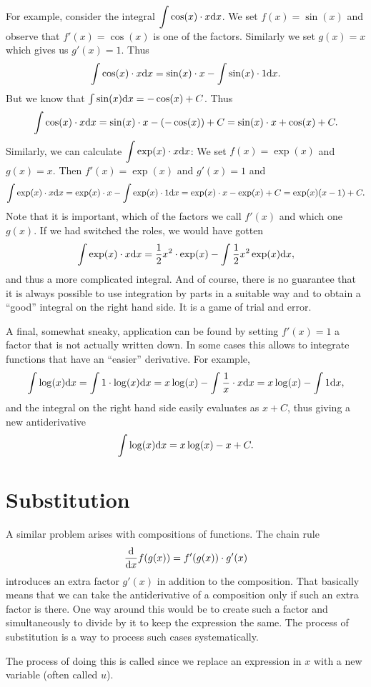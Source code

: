 For example, consider the integral
$\displaystyle\int \cos(x)\cdot x{\mbox{d}}x$. We set $f(x)=\sin(x)$ and observe
that $f'(x)=\cos(x)$ is one of the factors. Similarly we set $g(x)=x$ which
gives us $g'(x)=1$. Thus
\[
\int\cos(x)\cdot x{\mbox{d}}x=\sin(x)\cdot x-\int \sin(x)\cdot 1{\mbox{d}}x.
\]
But we know that $\int\sin(x){\mbox{d}}x=-\cos(x)+C$. Thus
\[
\int\cos(x)\cdot x{\mbox{d}}x=\sin(x)\cdot x-(-\cos(x))+C=\sin(x)\cdot
x+\cos(x)+C.
\]
Similarly, we can calculate $\displaystyle\int \exp(x)\cdot x{\mbox{d}}x$:
We set $f(x)=\exp(x)$ and
$g(x)=x$. Then $f'(x)=\exp(x)$ and $g'(x)=1$ and
\[
\int\exp(x)\cdot x{\mbox{d}}x=\exp(x)\cdot x-\int \exp(x)\cdot
1{\mbox{d}}x=\exp(x)\cdot x-\exp(x)+C=\exp(x)(x-1)+C.
\]
Note that it is important, which of the factors we call $f'(x)$ and which
one $g(x)$. If we had switched the roles, we would have gotten
\[
\int\exp(x)\cdot x{\mbox{d}}x=\frac{1}{2}x^2\cdot \exp(x)
-\int \frac{1}{2}x^2\exp(x){\mbox{d}}x,
\]
and thus a more complicated integral. And of course, there is no guarantee
that it is always possible to use integration by parts in a suitable way and
to obtain a ``good'' integral on the right hand side. It is a game of trial
and error.

A final, somewhat sneaky, application can be found by setting $f'(x)=1$ a
factor that is not actually written down. In some cases this allows to
integrate functions that have an ``easier'' derivative. For example,
\[
\int \log(x){\mbox{d}}x=\int 1\cdot \log(x){\mbox{d}}x
=x\log(x)-\int \frac{1}{x}\cdot x{\mbox{d}}x
=x\log(x)-\int 1{\mbox{d}}x,
\]
and the integral on the right hand side easily evaluates as $x+C$,
thus giving a new antiderivative
\[
\int\log(x){\mbox{d}}x=x\log(x)-x+C.
\]

\section{Substitution}

A similar problem arises with compositions of functions. The chain rule
\begin{equation}
\frac{\mbox{d}}{\mbox{d}x} f(g(x))=f'(g(x))\cdot g'(x)
\label{subschr}
\end{equation}
introduces an extra factor $g'(x)$ in addition to the composition. That
basically means that we can take the antiderivative of a composition only if
such an extra factor is there.  One way around this would be to create such
a factor and simultaneously to divide by it to keep the expression the same.
The process of substitution is a way to process such cases systematically.

The process of doing this is called  since we replace
an expression in $x$ with a new variable (often called $u$).

